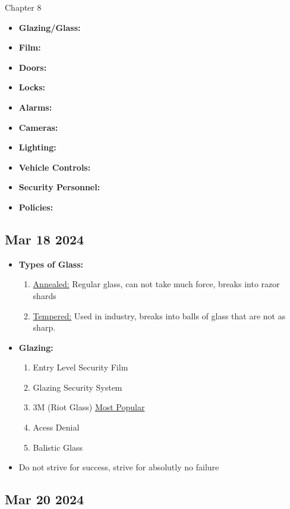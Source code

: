 \documentclass[12pt]{article}
\begin{document}
Chapter 8

\begin{itemize}
		  \item \textbf{Glazing/Glass:} 
		  \item \textbf{Film:}  
		  \item \textbf{Doors:}  
		  \item \textbf{Locks:}  
		  \item \textbf{Alarms:}  
		  \item \textbf{Cameras:}  
		  \item \textbf{Lighting:}  
		  \item \textbf{Vehicle Controls:}  
		  \item \textbf{Security Personnel:}  
		  \item \textbf{Policies:}  
\end{itemize}

\subsection*{Mar 18 2024}

\begin{itemize}
		  \item \textbf{Types of Glass:}  
				\begin{enumerate}
					\item \underline{Annealed:} Regular glass, can not take much force, 
						breaks into razor shards
				   \item \underline{Tempered:} Used in industry, breaks into balls of glass that are not 
						as sharp. 	
			 	\end{enumerate}
		  \item \textbf{Glazing:}  
				\begin{enumerate}
					\item Entry Level Security Film
					\item Glazing Security System
					\item 3M (Riot Glass) \underline{Most Popular}
					\item Acess Denial
					\item Balistic Glass
			 	\end{enumerate}
		  \item Do not strive for success, strive for absolutly no failure	
\end{itemize}

\subsection*{Mar 20 2024}
\end{document}
